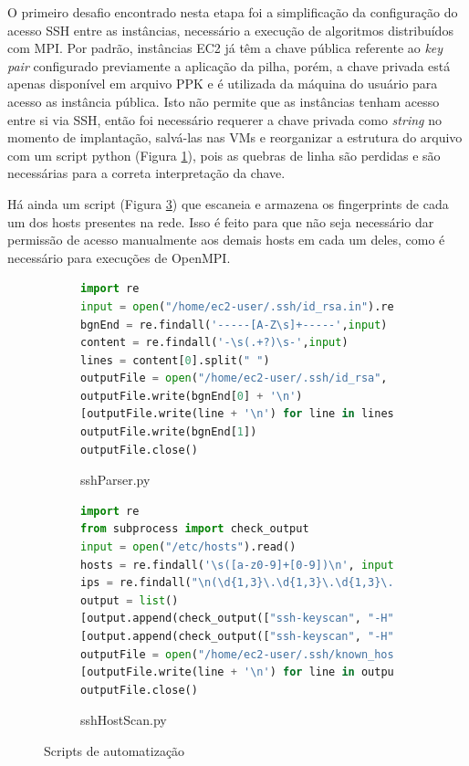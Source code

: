 \documentclass[tg]{mdtufsm}
\begin{document}
O primeiro desafio encontrado nesta etapa foi a simplificação da configuração do acesso SSH entre as instâncias, necessário a execução de algoritmos distribuídos com MPI. Por padrão, instâncias EC2 já têm a chave pública referente ao \emph{key pair} configurado previamente a aplicação da pilha, porém, a chave privada está apenas disponível em arquivo PPK e é utilizada da máquina do usuário para acesso as instância pública. Isto não permite que as instâncias tenham acesso entre si via SSH, então foi necessário requerer a chave privada como \emph{string} no momento de implantação, salvá-las nas VMs e reorganizar a estrutura do arquivo com um script python (Figura \ref{sshKeyParser}), pois as quebras de linha são perdidas e são necessárias para a correta interpretação da chave.

Há ainda um script (Figura \ref{hostScan}) que escaneia e armazena os fingerprints de cada um dos hosts presentes na rede. Isso é feito para que não seja necessário dar permissão de acesso manualmente aos demais hosts em cada um deles, como é necessário para execuções de OpenMPI.

\begin{figure}
\centering
\begin{subfigure}[c]{1\textwidth}
\begin{lstlisting}[frame=single, language=Python, numbers=none]
import re
input = open("/home/ec2-user/.ssh/id_rsa.in").read()
bgnEnd = re.findall('-----[A-Z\s]+-----',input)
content = re.findall('-\s(.+?)\s-',input)
lines = content[0].split(" ")
outputFile = open("/home/ec2-user/.ssh/id_rsa", "w")
outputFile.write(bgnEnd[0] + '\n')
[outputFile.write(line + '\n') for line in lines]
outputFile.write(bgnEnd[1])
outputFile.close()
\end{lstlisting}
\caption{sshParser.py}
\label{sshKeyParser}
\end{subfigure}

\begin{subfigure}[c]{1\textwidth}
\begin{lstlisting}[frame=single, language=Python, numbers=none]
import re
from subprocess import check_output
input = open("/etc/hosts").read()
hosts = re.findall('\s([a-z0-9]+[0-9])\n', input)
ips = re.findall("\n(\d{1,3}\.\d{1,3}\.\d{1,3}\.\d{1,3})\s", input)
output = list()
[output.append(check_output(["ssh-keyscan", "-H", ip])) for ip in ips]
[output.append(check_output(["ssh-keyscan", "-H", host])) for host in hosts]
outputFile = open("/home/ec2-user/.ssh/known_hosts", "w")
[outputFile.write(line + '\n') for line in output]
outputFile.close()
\end{lstlisting}
\caption{sshHostScan.py}
\label{hostScan}
\end{subfigure}
\caption{Scripts de automatização}
\end{figure}
\end{document}
